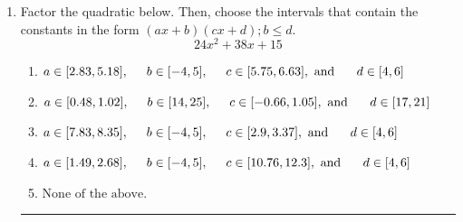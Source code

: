 \documentclass[14pt]{extbook}
\newcommand{\litem}[1]{\item#1\hspace*{-1cm}\rule{\textwidth}{0.4pt}}
\begin{document}
\begin{enumerate}
{\begin{enumerate}[label=\Alph*.]
\end{enumerate} }
\litem{
Factor the quadratic below. Then, choose the intervals that contain the constants in the form $(ax+b)(cx+d); b \leq d.$\[ 24x^{2} +38 x + 15 \]\begin{enumerate}[label=\Alph*.]
\item \( a \in [2.83, 5.18], \hspace*{5mm} b \in [-4, 5], \hspace*{5mm} c \in [5.75, 6.63], \text{ and } \hspace*{5mm} d \in [4, 6] \)
\item \( a \in [0.48, 1.02], \hspace*{5mm} b \in [14, 25], \hspace*{5mm} c \in [-0.66, 1.05], \text{ and } \hspace*{5mm} d \in [17, 21] \)
\item \( a \in [7.83, 8.35], \hspace*{5mm} b \in [-4, 5], \hspace*{5mm} c \in [2.9, 3.37], \text{ and } \hspace*{5mm} d \in [4, 6] \)
\item \( a \in [1.49, 2.68], \hspace*{5mm} b \in [-4, 5], \hspace*{5mm} c \in [10.76, 12.3], \text{ and } \hspace*{5mm} d \in [4, 6] \)
\item \( \text{None of the above.} \)


\end{enumerate}}
\end{enumerate}
\end{document}
